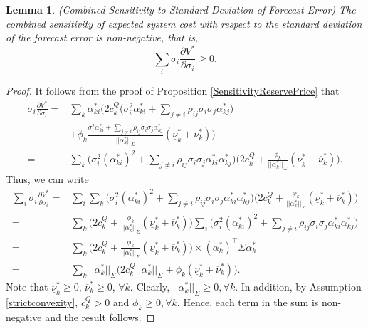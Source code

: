 \documentclass{article}
\newtheorem{lemma}{Lemma}
\begin{document}
\begin{lemma}\label{SensitivityTotalStandardDeviation}
(Combined Sensitivity to Standard Deviation of Forecast Error) The combined sensitivity of expected system cost with respect to the standard deviation of the forecast error is non-negative, that is, 
\begin{equation*}
\sum_i \sigma_i \frac{\partial V^*}{\partial \sigma_i} \ge 0.
\end{equation*}
\end{lemma}
\begin{proof}
It follows from the proof of Proposition \ref{SensitivityReservePrice} that
\begin{align*}
\sigma_i \frac{\partial V^*}{\partial \sigma_i} =& \sum_k\alpha_{ki}^*\Big(2c_k^Q\big(\sigma_i^2 \alpha_{ki}^* + \sum_{j \ne i} \rho_{ij} \sigma_i \sigma_j\alpha_{kj}^*\big)\\
&+ \phi_k \frac{\sigma_i^2 \alpha_{ki}^* + \sum_{j \ne i} \rho_{ij} \sigma_i \sigma_j \alpha_{kj}^*}{||\alpha_k^*||_{\Sigma}}(\underline{\nu}_k^* + \overline{\nu}_k^*)\Big)\\
=&  \sum_k\Big(\sigma_i^2 (\alpha_{ki}^*)^2 + \sum_{j \ne i} \rho_{ij} \sigma_i \sigma_j\alpha_{ki}^* \alpha_{kj}^*\Big)\Big(2c_k^Q + \frac{\phi_k}{||\alpha_k^*||_{\Sigma}}(\underline{\nu}_k^* + \overline{\nu}_k^*)\Big).
\end{align*}
Thus, we can write
\begin{align*}
\sum_i \sigma_i \frac{\partial V^*}{\partial \sigma_i} =& \sum_i \sum_k \Big(\sigma_i^2 (\alpha_{ki}^*)^2 + \sum_{j \ne i} \rho_{ij} \sigma_i \sigma_j\alpha_{ki}^* \alpha_{kj}^*\Big) \Big(2c_k^Q + \frac{\phi_k}{||\alpha_k^*||_{\Sigma}}(\underline{\nu}_k^* + \overline{\nu}_k^*)\Big)\\
=& \sum_k \Big(2c_k^Q + \frac{\phi_k}{||\alpha_k^*||_{\Sigma}}(\underline{\nu}_k^* + \overline{\nu}_k^*)\Big) \sum_i \Big(\sigma_i^2 (\alpha_{ki}^*)^2 + \sum_{j \ne i} \rho_{ij} \sigma_i \sigma_j\alpha_{ki}^* \alpha_{kj}^*\Big)\\
=& \sum_k \Big(2c_k^Q + \frac{\phi_k}{||\alpha_k^*||_{\Sigma}}(\underline{\nu}_k^* + \overline{\nu}_k^*)\Big) \times(\alpha_k^*)^\top \Sigma \alpha_k^*\\
=& \sum_k ||\alpha_k^*||_{\Sigma} \Big(2c_k^Q ||\alpha_k^*||_{\Sigma} + \phi_k (\underline{\nu}_k^* + \overline{\nu}_k^*)\Big).
\end{align*}
Note that $\underline{\nu}_k^* \ge 0$, $\overline{\nu}_k^* \ge 0$, $\forall k$. Clearly, $||\alpha_k^*||_{\Sigma} \ge 0, \forall k$. In addition, by Assumption \ref{strictconvexity}, $c_k^Q > 0$ and $\phi_k \ge 0, \forall k$. Hence, each term in the sum is non-negative and the result follows.
\end{proof}
\end{document}
